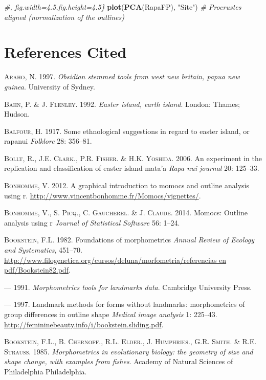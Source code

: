 \documentclass[]{article}
\newenvironment{Shaded}{\begin{snugshade}}{\end{snugshade}}
\newcommand{\KeywordTok}[1]{\textcolor[rgb]{0.13,0.29,0.53}{\textbf{{#1}}}}
\newcommand{\StringTok}[1]{\textcolor[rgb]{0.31,0.60,0.02}{{#1}}}
\newcommand{\CommentTok}[1]{\textcolor[rgb]{0.56,0.35,0.01}{\textit{{#1}}}}
\newcommand{\NormalTok}[1]{{#1}}
\begin{document}
\begin{Shaded}
\begin{Highlighting}[]
\CommentTok{#, fig.width=4.5,fig.height=4.5\}}
\KeywordTok{plot}\NormalTok{(}\KeywordTok{PCA}\NormalTok{(RapaFP), }\StringTok{"Site"}\NormalTok{) }\CommentTok{# Procrustes aligned (normalization of the outlines)}
\end{Highlighting}
\end{Shaded}

\section*{References Cited}\label{references-cited}

\textsc{Araho}, N. 1997. \emph{Obsidian stemmed tools from west new
britain, papua new guinea}. University of Sydney.

\textsc{Bahn}, P. \& J. \textsc{Flenley}. 1992. \emph{Easter island,
earth island}. London: Thames; Hudson.

\textsc{Balfour}, H. 1917. Some ethnological suggestions in regard to
easter island, or rapanui \emph{Folklore} 28: 356--81.

\textsc{Bollt}, R., J.E. \textsc{Clark}., P.R. \textsc{Fisher}. \& H.K.
\textsc{Yoshida}. 2006. An experiment in the replication and
classification of easter island mata'a \emph{Rapa nui journal} 20:
125--33.

\textsc{Bonhomme}, V. 2012. A graphical introduction to momocs and
outline analysis using r.
\url{http://www.vincentbonhomme.fr/Momocs/vignettes/}.

\textsc{Bonhomme}, V., S. \textsc{Picq}., C. \textsc{Gaucherel}. \& J.
\textsc{Claude}. 2014. Momocs: Outline analysis using r \emph{Journal of
Statistical Software} 56: 1--24.

\textsc{Bookstein}, F.L. 1982. Foundations of morphometrics \emph{Annual
Review of Ecology and Systematics}, 451--70.
\url{http://www.filogenetica.org/cursos/deluna/morfometria/referencias en pdf/Bookstein82.pdf}.

--- 1991. \emph{Morphometrics tools for landmarks data}. Cambridge
University Press.

--- 1997. Landmark methods for forms without landmarks: morphometrics of
group differences in outline shape \emph{Medical image analysis} 1:
225--43. \url{http://femininebeauty.info/i/bookstein.sliding.pdf}.

\textsc{Bookstein}, F.L., B. \textsc{Chernoff}., R.L. \textsc{Elder}.,
J. \textsc{Humphries}., G.R. \textsc{Smith}. \& R.E. \textsc{Strauss}.
1985. \emph{Morphometrics in evolutionary biology: the geometry of size
and shape change, with examples from fishes}. Academy of Natural
Sciences of Philadelphia Philadelphia.
\end{document}
